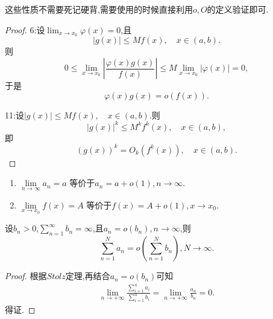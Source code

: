 \documentclass[lang=cn,newtx,10pt,scheme=chinese]{../Template/elegantbook}
\begin{document}
\begin{note}
这些性质不需要死记硬背,需要使用的时候直接利用$o,O$的定义验证即可.
\end{note}
\begin{proof}

{\color[RGB]{128, 128, 0} 6:}设\(\lim_{x\to x_0}\varphi(x) = 0\),且
\[
|g(x)|\leqslant  Mf(x),\quad x\in(a,b).
\]
则
\[
0\leqslant \lim_{x\to x_0}\left|\frac{\varphi(x)g(x)}{f(x)}\right|\leqslant  M\lim_{x\to x_0}|\varphi(x)| = 0,
\]
于是
\[
\varphi(x)g(x)=o(f(x)).
\]

{\color[RGB]{128, 128, 0} 11:}设\(|g(x)|\leqslant  Mf(x),\quad x\in(a,b)\).则
\[
|g(x)|^k\leqslant  M^k f^k(x),\quad x\in(a,b),
\]
即
\[
(g(x))^k = O_k(f^k(x)),\quad x\in(a,b).
\]

\end{proof}

\begin{proposition}[极限的等价定义]\label{proposition:极限的等价定义(用o余项定义极限)}
\begin{enumerate}
\item $\underset{n\rightarrow \infty}{\lim}a_n=a$
等价于$a_n=a+o\left( 1 \right) ,n\rightarrow \infty$.

\item $\underset{x\rightarrow x_0}{\lim}f\left( x \right) =A$
等价于$f\left( x \right) =A+o\left( 1 \right) ,x\rightarrow x_0$.
\end{enumerate}

\end{proposition}

\begin{theorem}\label{theorem:发散级数的求和号与o可交换}
设\(b_n>0\),\(\sum_{n = 1}^{\infty}b_n=\infty\),且\(a_n = o(b_n),n\to\infty\),则
\[
\sum_{n = 1}^{N}a_n=o\left(\sum_{n = 1}^{N}b_n\right),N\to\infty.
\]
\end{theorem}
\begin{proof}

根据$Stolz$定理,再结合$a_n=o\left( b_n \right)$可知
\begin{align*}
\underset{n\rightarrow +\infty}{\lim}\frac{\sum\limits_{i=1}^n{a_i}}{\sum\limits_{i=1}^n{b_i}}=\underset{n\rightarrow +\infty}{\lim}\frac{a_n}{b_n}=0.
\end{align*}得证.

\end{proof}
\end{document}
